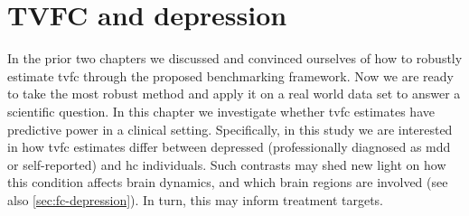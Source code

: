 \chapter{TVFC and depression}
\label{ch:ukb}

In the prior two chapters we discussed and convinced ourselves of how to robustly estimate \gls{tvfc} through the proposed benchmarking framework.
Now we are ready to take the most robust method and apply it on a real world data set to answer a scientific question.
%
In this chapter we investigate whether \gls{tvfc} estimates have predictive power in a clinical setting.
Specifically, in this study we are interested in how \gls{tvfc} estimates differ between depressed (professionally diagnosed as \gls{mdd} or self-reported) and \gls{hc} individuals.
Such contrasts may shed new light on how this condition affects brain dynamics, and which brain regions are involved (see also \cref{sec:fc-depression}).
In turn, this may inform treatment targets.
